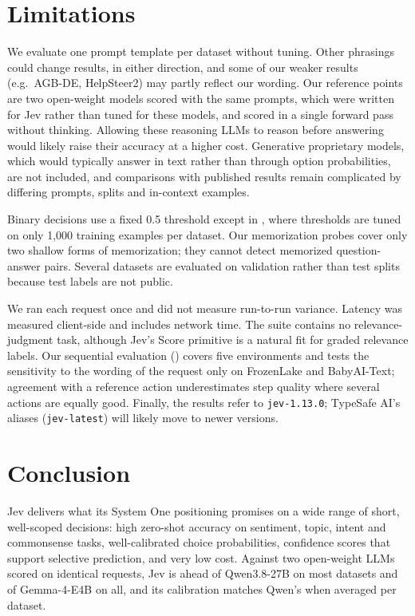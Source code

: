\documentclass[table]{article}
\begin{document}
\section{Limitations}
\label{sec:limitations}

We evaluate one prompt template per dataset without tuning. Other phrasings could change results, in either direction, and some of our weaker results (e.g.\ AGB-DE, HelpSteer2) may partly reflect our wording. Our reference points are two open-weight models scored with the same prompts, which were written for Jev rather than tuned for these models, and scored in a single forward pass without thinking. Allowing these reasoning LLMs to reason before answering would likely raise their accuracy at a higher cost. Generative proprietary models, which would typically answer in text rather than through option probabilities, are not included, and comparisons with published results remain complicated by differing prompts, splits and in-context examples. 

Binary decisions use a fixed 0.5 threshold except in , where thresholds are tuned on only 1{,}000 training examples per dataset. Our memorization probes cover only two shallow forms of memorization; they cannot detect memorized question-answer pairs. Several datasets are evaluated on validation rather than test splits because test labels are not public. 

We ran each request once and did not measure run-to-run variance. Latency was measured client-side and includes network time. The suite contains no relevance-judgment task, although Jev's Score primitive is a natural fit for graded relevance labels. Our sequential evaluation () covers five environments and tests the sensitivity to the wording of the request only on FrozenLake and BabyAI-Text; agreement with a reference action underestimates step quality where several actions are equally good. Finally, the results refer to \texttt{jev-1.13.0}; TypeSafe AI's aliases (\texttt{jev-latest}) will likely move to newer versions.


\section{Conclusion}

Jev delivers what its System One positioning promises on a wide range of short, well-scoped decisions: high zero-shot accuracy on sentiment, topic, intent and commonsense tasks, well-calibrated choice probabilities, confidence scores that support selective prediction, and very low cost. Against two open-weight LLMs scored on identical requests, Jev is ahead of Qwen3.8-27B on most datasets and of Gemma-4-E4B on all, and its calibration matches Qwen's when averaged per dataset.
\end{document}
